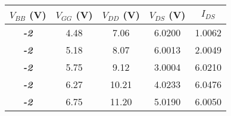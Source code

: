 \begin{tabular}{@{}ccccc@{}}
\toprule
\textbf{$V_{BB}$ (V)} & \multicolumn{1}{l}{\textbf{$V_{GG}$ (V)}} & \textbf{$V_{DD}$ (V)} & \textbf{$V_{DS}$ (V)} & \textbf{$I_{DS}$} \\ \midrule
\textit{\textbf{-2}}     &  4.48     &  7.06     & 6.0200       &  1.0062     \\
\textit{\textbf{-2}}     &  5.18     &  8.07     & 6.0013      &  2.0049     \\
\textit{\textbf{-2}}     &  5.75     &  9.12     & 3.0004      & 6.0210      \\
\textit{\textbf{-2}}     &  6.27     &  10.21     & 4.0233      &  6.0476     \\
\textit{\textbf{-2}}     &  6.75     &  11.20     & 5.0190      &  6.0050     \\ \bottomrule
\end{tabular}